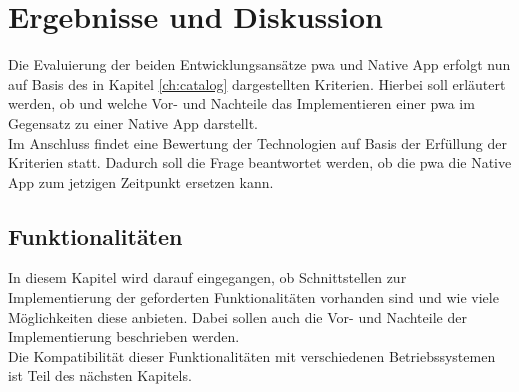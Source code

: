 \chapter{Ergebnisse und Diskussion}\label{ch:results}
Die Evaluierung der beiden Entwicklungsansätze \ac{pwa} und Native App erfolgt nun auf Basis des in Kapitel \ref{ch:catalog} dargestellten Kriterien.
Hierbei soll erläutert werden, ob und welche Vor- und Nachteile das Implementieren einer \ac{pwa} im Gegensatz zu einer Native App darstellt.\\
Im Anschluss findet eine Bewertung der Technologien auf Basis der Erfüllung der Kriterien statt.
Dadurch soll die Frage beantwortet werden, ob die \ac{pwa} die Native App zum jetzigen Zeitpunkt ersetzen kann.

\section{Funktionalitäten}
In diesem Kapitel wird darauf eingegangen, ob Schnittstellen zur Implementierung der geforderten Funktionalitäten vorhanden sind und wie viele Möglichkeiten diese anbieten.
Dabei sollen auch die Vor- und Nachteile der Implementierung beschrieben werden.\\
Die Kompatibilität dieser Funktionalitäten mit verschiedenen Betriebssystemen ist Teil des nächsten Kapitels.


